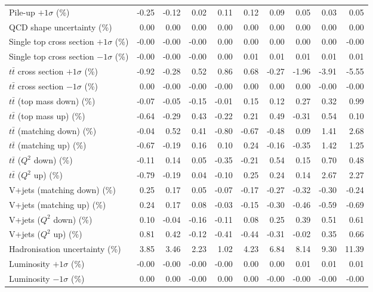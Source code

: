\begin{table}[htbp]
{\begin{tabular}{lrrrrrrrrr}
Pile-up $+1\sigma$ (\%) & -0.25 & -0.12 & 0.02 & 0.11 & 0.12 & 0.09 & 0.05 & 0.03 & 0.05 \\ 
QCD shape uncertainty (\%) & 0.00 & 0.00 & 0.00 & 0.00 & 0.00 & 0.00 & 0.00 & 0.00 & 0.00 \\ 
Single top cross section $+1\sigma$ (\%) & -0.00 & -0.00 & -0.00 & 0.00 & 0.00 & 0.00 & 0.00 & 0.00 & -0.00 \\ 
Single top cross section $-1\sigma$ (\%) & -0.00 & -0.00 & -0.00 & 0.00 & 0.01 & 0.01 & 0.01 & 0.01 & 0.01 \\ 
$t\bar{t}$ cross section $+1\sigma$ (\%) & -0.92 & -0.28 & 0.52 & 0.86 & 0.68 & -0.27 & -1.96 & -3.91 & -5.55 \\ 
$t\bar{t}$ cross section $-1\sigma$ (\%) & 0.00 & -0.00 & -0.00 & -0.00 & 0.00 & 0.00 & 0.00 & -0.00 & -0.00 \\ 
$t\bar{t}$ (top mass down) (\%) & -0.07 & -0.05 & -0.15 & -0.01 & 0.15 & 0.12 & 0.27 & 0.32 & 0.99 \\ 
$t\bar{t}$ (top mass up) (\%) & -0.64 & -0.29 & 0.43 & -0.22 & 0.21 & 0.49 & -0.31 & 0.54 & 0.10 \\ 
$t\bar{t}$ (matching down) (\%) & -0.04 & 0.52 & 0.41 & -0.80 & -0.67 & -0.48 & 0.09 & 1.41 & 2.68 \\ 
$t\bar{t}$ (matching up) (\%) & -0.67 & -0.19 & 0.16 & 0.10 & 0.24 & -0.16 & -0.35 & 1.42 & 1.25 \\ 
$t\bar{t}$ ($Q^{2}$ down) (\%) & -0.11 & 0.14 & 0.05 & -0.35 & -0.21 & 0.54 & 0.15 & 0.70 & 0.48 \\ 
$t\bar{t}$ ($Q^{2}$ up) (\%) & -0.79 & -0.19 & 0.04 & -0.10 & 0.25 & 0.24 & 0.14 & 2.67 & 2.27 \\ 
V+jets (matching down) (\%) & 0.25 & 0.17 & 0.05 & -0.07 & -0.17 & -0.27 & -0.32 & -0.30 & -0.24 \\ 
V+jets (matching up) (\%) & 0.24 & 0.17 & 0.08 & -0.03 & -0.15 & -0.30 & -0.46 & -0.59 & -0.69 \\ 
V+jets ($Q^{2}$ down) (\%) & 0.10 & -0.04 & -0.16 & -0.11 & 0.08 & 0.25 & 0.39 & 0.51 & 0.61 \\ 
V+jets ($Q^{2}$ up) (\%) & 0.81 & 0.42 & -0.12 & -0.41 & -0.44 & -0.31 & -0.02 & 0.35 & 0.66 \\ 
Hadronisation uncertainty (\%) & 3.85 & 3.46 & 2.23 & 1.02 & 4.23 & 6.84 & 8.14 & 9.30 & 11.39 \\ 
Luminosity $+1\sigma$ (\%) & -0.00 & -0.00 & -0.00 & -0.00 & 0.00 & 0.00 & 0.01 & 0.01 & 0.01 \\ 
Luminosity $-1\sigma$ (\%) & 0.00 & 0.00 & -0.00 & 0.00 & 0.00 & -0.00 & -0.00 & -0.00 & -0.00 \\ 

\end{tabular}}
\end{table}
